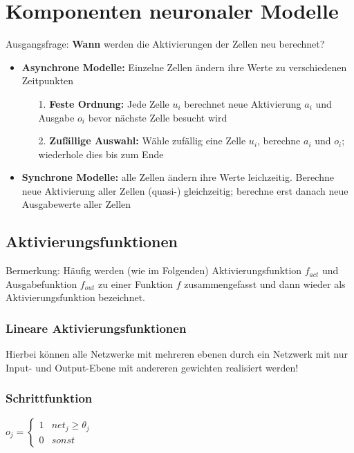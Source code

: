 \section*{Komponenten neuronaler Modelle}
Ausgangsfrage: \textbf{Wann} werden die Aktivierungen der Zellen neu berechnet?\\
\begin{itemize}
\item \textbf{Asynchrone Modelle:} Einzelne Zellen ändern ihre Werte zu verschiedenen Zeitpunkten
\begin{itemize}
\item[1.] \textbf{Feste Ordnung:} Jede Zelle $u_i$ berechnet neue Aktivierung $a_i$ und Ausgabe $o_i$ bevor nächste Zelle besucht wird
\item[2.] \textbf{Zufällige Auswahl:} Wähle zufällig eine Zelle $u_i$, berechne $a_i$ und $o_i$; wiederhole dies bis zum Ende
\end{itemize}
\item \textbf{Synchrone Modelle:} alle Zellen ändern ihre Werte leichzeitig. Berechne neue Aktivierung aller Zellen (quasi-) gleichzeitig; berechne erst danach neue Ausgabewerte aller Zellen 
\end{itemize}

\subsection*{Aktivierungsfunktionen}
Bermerkung: Häufig werden (wie im Folgenden) Aktivierungsfunktion $f_{act}$ und Ausgabefunktion $f_{out}$ zu einer Funktion $f$ zusammengefasst und dann wieder als Aktivierungsfunktion bezeichnet.\\
\subsubsection*{Lineare Aktivierungsfunktionen}
Hierbei können alle Netzwerke mit mehreren ebenen durch ein Netzwerk mit nur Input- und Output-Ebene mit andereren gewichten realisiert werden!

\subsubsection*{Schrittfunktion}
$o_j = \begin{cases} 1 & net_j \geq \theta_j\\ 0 & sonst \end{cases}$

